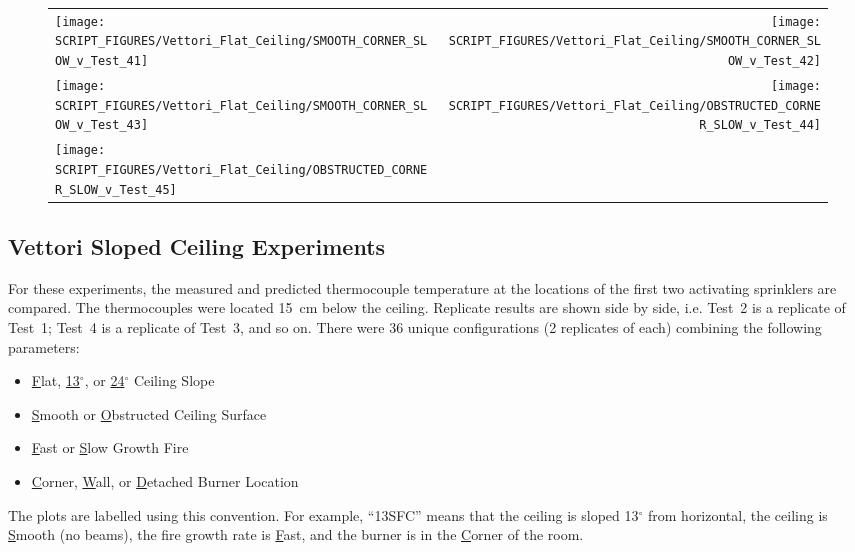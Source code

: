 \begin{figure}[p]
\begin{tabular*}{\textwidth}{l@{\extracolsep{\fill}}r}
\texttt{[image: SCRIPT\_FIGURES/Vettori\_Flat\_Ceiling/SMOOTH\_CORNER\_SLOW\_v\_Test\_41]} &
\texttt{[image: SCRIPT\_FIGURES/Vettori\_Flat\_Ceiling/SMOOTH\_CORNER\_SLOW\_v\_Test\_42]} \\
\texttt{[image: SCRIPT\_FIGURES/Vettori\_Flat\_Ceiling/SMOOTH\_CORNER\_SLOW\_v\_Test\_43]} &
\texttt{[image: SCRIPT\_FIGURES/Vettori\_Flat\_Ceiling/OBSTRUCTED\_CORNER\_SLOW\_v\_Test\_44]} \\
\texttt{[image: SCRIPT\_FIGURES/Vettori\_Flat\_Ceiling/OBSTRUCTED\_CORNER\_SLOW\_v\_Test\_45]} \\
\end{tabular*}
\label{Vettori_6}
\end{figure}


\clearpage

\subsection{Vettori Sloped Ceiling Experiments}
\label{Vettori_Sloped_Results}

For these experiments, the measured and predicted thermocouple temperature at the locations of the first two activating sprinklers are compared. The thermocouples were located 15~cm below the ceiling. Replicate results are shown side by side, i.e. Test~2 is a replicate of Test~1; Test~4 is a replicate of Test~3, and so on. There were 36 unique configurations (2 replicates of each) combining the following parameters:
\begin{itemize}
\item \underline{F}lat, \underline{13}$^\circ$, or \underline{24}$^\circ$ Ceiling Slope
\item \underline{S}mooth or \underline{O}bstructed Ceiling Surface
\item \underline{F}ast or \underline{S}low Growth Fire
\item \underline{C}orner, \underline{W}all, or \underline{D}etached Burner Location
\end{itemize}
The plots are labelled using this convention. For example, ``13SFC'' means that the ceiling is sloped 13$^\circ$ from horizontal, the ceiling is \underline{S}mooth (no beams), the fire growth rate is \underline{F}ast, and the burner is in the \underline{C}orner of the room.




